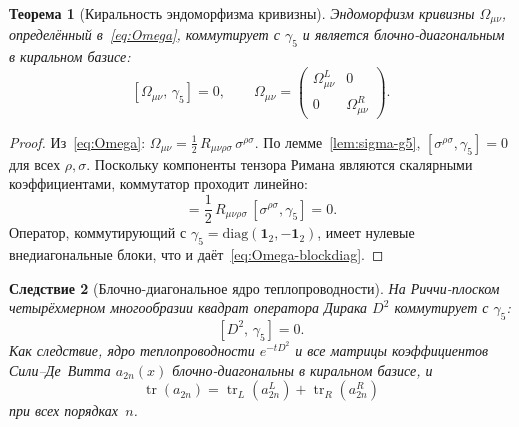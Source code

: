 \documentclass[12pt,a4paper]{article}
\newtheorem{theorem}{Теорема}[section]
\newtheorem{corollary}[theorem]{Следствие}
\theoremstyle{definition}
\theoremstyle{remark}
\newcommand{\tr}{\operatorname{tr}}
\begin{document}
\begin{theorem}[Киральность эндоморфизма кривизны]
\label{thm:chirality}
Эндоморфизм кривизны $\Omega_{\mu\nu}$, определённый
в~\eqref{eq:Omega}, коммутирует с $\gamma_5$ и является
блочно-диагональным в киральном базисе:
\begin{equation}\label{eq:Omega-blockdiag}
  [\Omega_{\mu\nu},\, \gamma_5] = 0, \qquad
  \Omega_{\mu\nu} = \begin{pmatrix}
    \Omega^L_{\mu\nu} & 0 \\ 0 & \Omega^R_{\mu\nu}
  \end{pmatrix}.
\end{equation}
\end{theorem}

\begin{proof}
Из~\eqref{eq:Omega}: $\Omega_{\mu\nu} = \frac{1}{2}\,R_{\mu\nu\rho\sigma}\,
\sigma^{\rho\sigma}$.  По лемме~\ref{lem:sigma-g5},
$[\sigma^{\rho\sigma}, \gamma_5] = 0$ для всех $\rho, \sigma$.  Поскольку
компоненты тензора Римана являются скалярными коэффициентами, коммутатор
проходит линейно:
\begin{equation}
  [\Omega_{\mu\nu}, \gamma_5]
  = \frac{1}{2}\,R_{\mu\nu\rho\sigma}\,[\sigma^{\rho\sigma}, \gamma_5]
  = 0.
\end{equation}
Оператор, коммутирующий с $\gamma_5 = \mathrm{diag}(\mathbf{1}_2, -\mathbf{1}_2)$,
имеет нулевые внедиагональные блоки, что и даёт~\eqref{eq:Omega-blockdiag}.
\end{proof}

\begin{corollary}[Блочно-диагональное ядро теплопроводности]
\label{cor:heat}
На Риччи-плоском четырёхмерном многообразии квадрат оператора Дирака $D^2$
коммутирует с $\gamma_5$:
\begin{equation}\label{eq:D2-g5}
  [D^2,\, \gamma_5] = 0.
\end{equation}
Как следствие, ядро теплопроводности $e^{-tD^2}$ и все матрицы коэффициентов
Сили--Де~Витта $a_{2n}(x)$ блочно-диагональны в киральном базисе, и
\begin{equation}\label{eq:tr-decompose}
  \tr(a_{2n}) = \tr_L(a_{2n}^L) + \tr_R(a_{2n}^R)
\end{equation}
при всех порядках~$n$.
\end{corollary}
\end{document}
